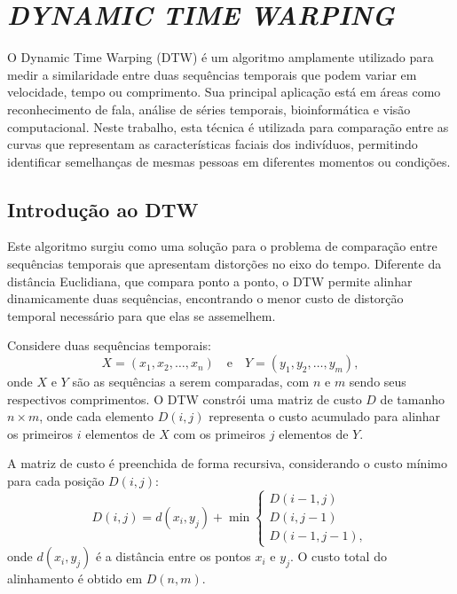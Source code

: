 \chapter{\textit{DYNAMIC TIME WARPING}} \label{cha:dtw}

O Dynamic Time Warping (DTW) é um algoritmo amplamente utilizado para medir a similaridade entre duas sequências temporais que podem variar em velocidade, tempo ou comprimento. Sua principal aplicação está em áreas como reconhecimento de fala, análise de séries temporais, bioinformática e visão computacional. Neste trabalho, esta técnica é utilizada para comparação entre as curvas que representam as características faciais dos indivíduos, permitindo identificar semelhanças de mesmas pessoas em diferentes momentos ou condições.

\section{Introdução ao DTW}

Este algoritmo surgiu como uma solução para o problema de comparação entre sequências temporais que apresentam distorções no eixo do tempo. Diferente da distância Euclidiana, que compara ponto a ponto, o DTW permite alinhar dinamicamente duas sequências, encontrando o menor custo de distorção temporal necessário para que elas se assemelhem.

Considere duas sequências temporais:
\begin{equation}
    X = (x_1, x_2, \ldots, x_n) \quad \text{e} \quad Y = (y_1, y_2, \ldots, y_m),
\end{equation}
onde \(X\) e \(Y\) são as sequências a serem comparadas, com \(n\) e \(m\) sendo seus respectivos comprimentos. O DTW constrói uma matriz de custo \(D\) de tamanho \(n \times m\), onde cada elemento \(D(i, j)\) representa o custo acumulado para alinhar os primeiros \(i\) elementos de \(X\) com os primeiros \(j\) elementos de \(Y\).

A matriz de custo é preenchida de forma recursiva, considerando o custo mínimo para cada posição \(D(i, j)\):
\begin{equation}
    D(i, j) = d(x_i, y_j) + \min \begin{cases}
        D(i-1, j) \\
        D(i, j-1) \\
        D(i-1, j-1),
    \end{cases}
\end{equation}
onde \(d(x_i, y_j)\) é a distância entre os pontos \(x_i\) e \(y_j\). O custo total do alinhamento é obtido em \(D(n, m)\).

